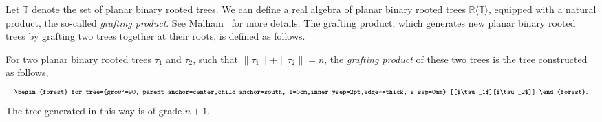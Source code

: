 \documentclass[5p,twocolumn]{elsarticle}
\newcommand*{\R}{\mathbb R}
\begin{document}
Let $\mathbb T$ denote the set of planar binary rooted trees.
We can define a real algebra of planar binary rooted trees $\R\langle\mathbb T\rangle$, equipped with a natural product, the so-called \emph{grafting product}.
See Malham~\cite{M-coag} for more details. 
The grafting product, which generates new planar binary rooted trees by grafting two trees together at their roots, is defined as follows.
%
\begin{definition}\label{def:graftingontrees}
  For two planar binary rooted trees $\tau_1$ and $\tau_2$, such that $\|\tau_1\|+\|\tau_2\|=n$, the \emph{grafting product} of these two trees is the tree constructed as follows, 
\begin{equation*}
     {\scriptsize \begin{forest} for tree={grow'=90, parent anchor=center,child anchor=south, l=0cm,inner ysep=2pt,edge+=thick, s sep=0mm} [[$\tau_1$][$\tau_2$]] \end{forest}}.
\end{equation*}
The tree generated in this way is of grade $n+1$.
\end{definition}
%
\end{document}
